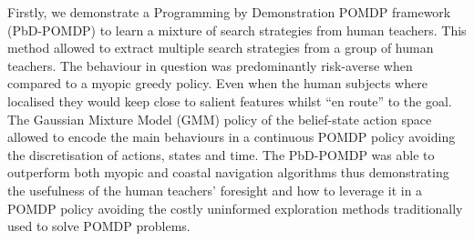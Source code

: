 
%
%

Firstly, we demonstrate a Programming by Demonstration POMDP framework (PbD-POMDP) to learn a mixture of search strategies 
from human teachers. This method allowed to extract multiple search strategies from a group of human teachers. The behaviour
in question was predominantly risk-averse when compared to a myopic greedy policy. Even when the human subjects where localised they 
would keep close to salient features whilst ``en route'' to the goal. The Gaussian Mixture Model (GMM) policy of the belief-state action 
space allowed to encode the main behaviours in a continuous POMDP policy avoiding the discretisation of actions, states and time.
The PbD-POMDP was able to outperform both myopic and coastal navigation algorithms thus demonstrating the usefulness of the human 
teachers' foresight and how to leverage it in a POMDP policy avoiding the costly uninformed exploration methods traditionally 
used to solve POMDP problems.


%
%

